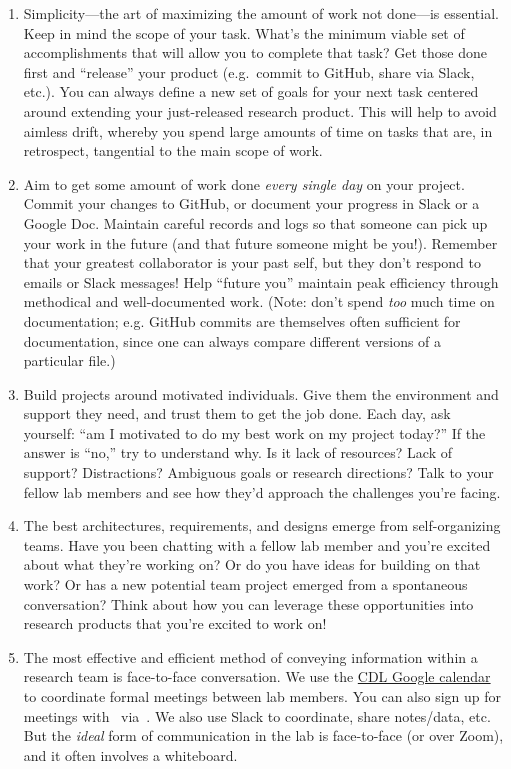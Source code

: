 \documentclass{tufte-book} %
\begin{document}
\begin{enumerate}
\item Simplicity---the art of maximizing the amount of work not
  done---is essential.  Keep in mind the scope of your task.  What's
  the minimum viable set of accomplishments that will allow you to
  complete that task?  Get those done first and ``release'' your
  product (e.g.\ commit to GitHub, share via Slack, etc.).  You can
  always define a new set of goals for your next task centered around
  extending your just-released research product.  This will help to
  avoid aimless drift, whereby you spend large amounts of time on
  tasks that are, in retrospect, tangential to the main scope of work.

\item Aim to get some amount of work done \textit{every single day} on
  your project.  Commit your changes to GitHub, or document your
  progress in Slack or a Google Doc.  Maintain careful records and
  logs so that someone can pick up your work in the future (and that
  future someone might be you!).  Remember that your greatest
  collaborator is your past self, but they don't respond to emails or
  Slack messages!  Help ``future you'' maintain peak efficiency
  through methodical and well-documented work.  (Note: don't spend
  \textit{too} much time on documentation; e.g. GitHub commits are
  themselves often sufficient for documentation, since one can always
  compare different versions of a particular file.)

\item Build projects around motivated individuals.  Give them the
  environment and support they need, and trust them to get the job
  done.  Each day, ask yourself: ``am I motivated to do my best work
  on my project today?''  If the answer is ``no,'' try to understand
  why.  Is it lack of resources?  Lack of support?  Distractions?
  Ambiguous goals or research directions?  Talk to your fellow lab
  members and see how they'd approach the challenges you're facing.

\item The best architectures, requirements, and designs emerge from
  self-organizing teams.  Have you been chatting with a fellow lab
  member and you're excited about what they're working on?  Or do you
  have ideas for building on that work?  Or has a new potential team
  project emerged from a spontaneous conversation?  Think about how
  you can leverage these opportunities into research products that
  you're excited to work on!

\item The most effective and efficient method of conveying information within a
research team is face-to-face conversation. We use the \hyperref[sec:
scheduling]{CDL Google calendar} to coordinate formal meetings between lab
members. You can also sign up for meetings with \director~via~\meeting. We also
use Slack to coordinate, share notes/data, etc. But the \textit{ideal} form of
communication in the lab is face-to-face (or over Zoom), and it often involves
a whiteboard.


\end{enumerate}
\end{document}
